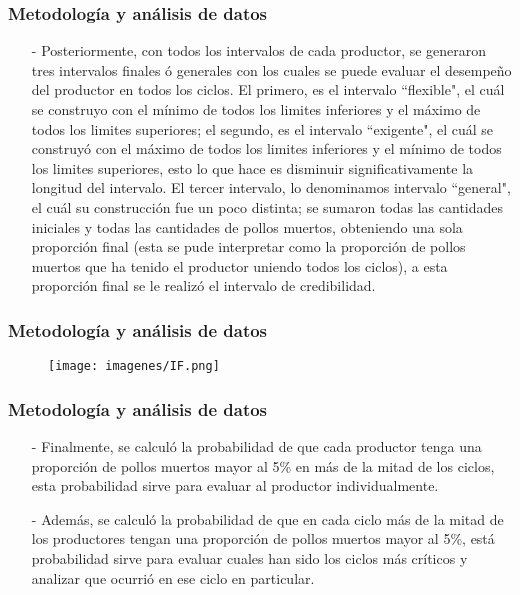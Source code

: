\documentclass[11pt]{beamer}
\begin{document}
\begin{frame}
\frametitle{Metodología y análisis de datos}
\begin{itemize}
\item[-]Posteriormente, con todos los intervalos de cada productor, se generaron tres intervalos finales ó generales con los cuales se puede evaluar el desempeño del productor en todos los ciclos. El primero, es el intervalo ``flexible", el cuál se construyo con el mínimo de todos los limites inferiores y el máximo de todos los limites superiores; el segundo, es el intervalo ``exigente", el cuál se construyó con el máximo de todos los limites inferiores y el mínimo de todos los limites superiores, esto lo que hace es disminuir significativamente la longitud del intervalo. El tercer intervalo, lo denominamos intervalo ``general", el cuál su construcción fue un poco distinta; se sumaron todas las cantidades iniciales y todas las cantidades de pollos muertos, obteniendo una sola proporción final (esta se pude interpretar como la proporción de pollos muertos que ha tenido el productor uniendo todos los ciclos), a esta proporción final se le realizó el intervalo de credibilidad.
\end{itemize}
\end{frame}

\begin{frame}
\frametitle{Metodología y análisis de datos}
\begin{figure}[!h]
        \texttt{[image: imagenes/IF.png]}
        \label{figura1}
\end{figure}
\end{frame}

\begin{frame}
\frametitle{Metodología y análisis de datos}
\begin{itemize}
\item[-]Finalmente, se calculó la probabilidad de que cada productor tenga una proporción de pollos muertos mayor al 5\% en más de la mitad de los ciclos, esta probabilidad sirve para evaluar al productor individualmente.
\item[-]Además, se calculó la probabilidad de que en cada ciclo más de la mitad de los productores tengan una proporción de pollos muertos mayor al 5\%, está probabilidad sirve para evaluar cuales han sido los ciclos más críticos y analizar que ocurrió en ese ciclo en particular.
\end{itemize}
\end{frame}
\end{document}
